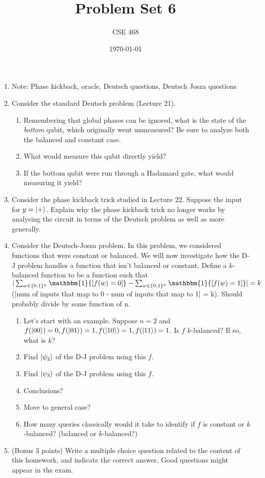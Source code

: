 \documentclass[12pt]{article}
\title{Problem Set 6}
\author{CSE 468}
\date{\today}
\begin{document}
\maketitle



\begin{enumerate}[font=\bfseries]

    \item Note: Phase kickback, oracle, Deutsch questions, Deutsch Josza questions
    \item Consider the standard Deutsch problem (Lecture 21).
    \begin{enumerate}
        \item Remembering that global phases can be ignored, what is the state of the \emph{bottom} qubit, which originally went unmeasured? Be sure to analyze both the balanced and constant case.
        \item What would measure this qubit directly yield?
        \item If the bottom qubit were run through a Hadamard gate, what would measuring it yield?
    \end{enumerate}
    \item Consider the phase kickback trick studied in Lecture 22. Suppose the input for $y = \ket{+}$. Explain why the phase kickback trick no longer works by analysing the circuit in terms of the Deutsch problem as well as more generally.
    \item Consider the Deutsch-Josza problem. In this problem, we considered functions that were constant or balanced. We will now investigate how the D-J problem handles a function that isn't balanced or constant. Define a $k$-balanced function to be a function such that $|\sum_{w\in\{0,1\}^n} \mathbbm{1}{[f(w) = 0]} - \sum_{w\in\{0,1\}^n} \mathbbm{1}{[f(w) = 1]}| = k$ (|num of inputs that map to 0 - num of inputs that map to 1| = k). Should probably divide by some function of n.
    \begin{enumerate}
        \item Let's start with an example. Suppose $n = 2$ and $f(\ket{00}) = 0, f(\ket{01}) = 1, f(\ket{10}) = 1, f(\ket{11}) = 1$. Is $f$ $k$-balanced? If so, what is $k$?
        \item Find $\ket{\psi_2}$ of the D-J problem using this $f$.
        \item Find $\ket{\psi_3}$ of the D-J problem using this $f$.
        \item Conclusions?
        \item Move to general case?
        \item How many queries classically would it take to identify if $f$ is constant or $k$-balanced? (balanced or $k$-balanced?)
    \end{enumerate}
    \item (Bonus 3 points) Write a multiple choice question related to the content of this homework, and indicate the correct answer. Good questions might appear in the exam.
\end{enumerate}
\end{document}

